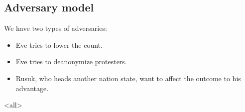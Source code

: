 \subsection{Adversary model}

We have two types of adversaries:
\begin{frame}
\begin{itemize}
  \item Eve tries to lower the count.
  \item Eve tries to deanonymize protesters.
  \item Rusuk, who heads another nation state, want to affect the outcome to 
    his advantage.
\end{itemize}
\end{frame}


\mode<all>\endinput

\section{Old stuff}

We can divide the problem into three parts:
\begin{itemize}
  \item Register participants in the system.
  \item Collect the necessary data.
  \item Perform the counting and verification.
\end{itemize}

To register the participants we might be able to piggy-back on existing 
\acp{PKI} and blind signatures --- similarly as for voting systems.

There are several issues that must be treated:
\begin{itemize}
  \item Each location proof must be bound to one individual's participation.
    One protester must not be able to create two unique location proofs and be 
    able to increase the number of participants, that would violate 
    \cref{EligibilityVerif} above.
    In other words, we must prevent the Sybil attack.

  \item A group of people should not be able to generate \acp{LP} to make it 
    look as if they participated in the protest but actually stayed at home.
    This means that all \acp{LP} must be linked to each other.
    If a protest has hundreds of thousands of participants, then this linking 
    must be achieved efficiently.
\end{itemize}

